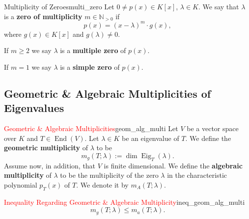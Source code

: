 \begin{definition}{Multiplicity of Zeroes}{multi_zero}
	Let $0 \neq p(x) \in K[x]$, $\lambda \in K$. We say that $\lambda$ is a \textbf{zero of multiplicity} $m \in \mathbb{N}_{>0}$ if
	\[
		p(x) = (x- \lambda)^m \cdot g(x),
	\]
	where $g(x) \in K[x]$ and $g(\lambda) \neq 0$.
	
	If $m \geq 2$ we say $\lambda$ is a \textbf{multiple zero} of $p(x)$.
	
	If $m = 1$ we say $\lambda$ is a \textbf{simple zero} of $p(x)$.
\end{definition}


\subsection{Geometric \& Algebraic Multiplicities of Eigenvalues}

\begin{definition}{\textcolor{red}{Geometric \& Algebraic Multiplicities}}{geom_alg_multi}
	Let $V$ be a vector space over $K$ and $T \in \operatorname{End}(V)$. Let $\lambda \in K$ be an eigenvalue of $T$. We define the \textbf{geometric multiplicity} of $\lambda$ to be
	\[
		m_g(T;\lambda) := \dim \operatorname{Eig}_T(\lambda).
	\]
	Assume now, in addition, that $V$ is finite dimensional. We define the \textbf{algebraic multiplicity} of $\lambda$ to be the multiplicity of the zero $\lambda$ in the characteristic polynomial $p_T(x)$ of $T$. We denote it by $m_A(T;\lambda)$.
\end{definition}

\begin{proposition}{\textcolor{red}{Inequality Regarding Geometric \& Algebraic Multiplicity}}{ineq_geom_alg_multi}
	\[
		m_g(T;\lambda) \leq m_a(T;\lambda).
	\]
\end{proposition}

